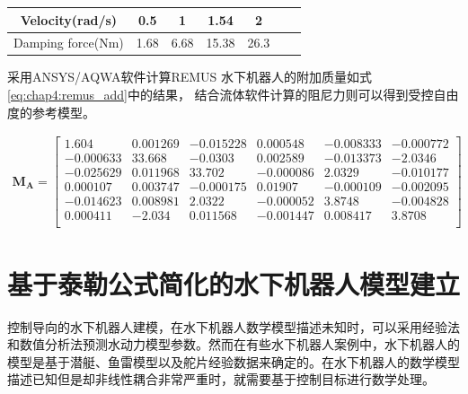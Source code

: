 \begin{table}
\centering
\label{tab:chap4:table_auv2}
\begin{tabular}{ccccccc}
\toprule
 Velocity(rad/s)    & 0.5 & 1 & 1.54 &2   \\
\midrule
 Damping force(Nm) & 1.68 &6.68 &15.38 & 26.3   \\
\bottomrule
\end{tabular}
\end{table}

采用ANSYS/AQWA软件计算REMUS 水下机器人的附加质量如式\ref{eq:chap4:remus_add}中的结果， 结合流体软件计算的阻尼力则可以得到受控自由度的参考模型。

\begin{equation}
\label{eq:chap4:remus_add}
\begin{aligned}
\bm{M_{A}} = \begin{bmatrix}
     1.604 &   0.001269 &  -0.015228 &  0.000548 &   -0.008333 & -0.000772  \\
     -0.000633 &   33.668 &  -0.0303 &  0.002589 &   -0.013373 & -2.0346  \\
     -0.025629 &  0.011968  &  33.702  &  -0.000086 &  2.0329 &  -0.010177\\
     0.000107 &  0.003747  &  -0.000175  & 0.01907 & -0.000109  &  -0.002095\\
     -0.014623  &  0.008981 &  2.0322  &  -0.000052 &   3.8748  & -0.004828\\
     0.000411  &  -2.034 &  0.011568 &  -0.001447 &  0.008417  &  3.8708\\
         \end{bmatrix}
\end{aligned}
\end{equation}






\section{基于泰勒公式简化的水下机器人模型建立  }

控制导向的水下机器人建模，在水下机器人数学模型描述未知时，可以采用经验法和数值分析法预测水动力模型参数。然而在有些水下机器人案例中，水下机器人的模型是基于潜艇、鱼雷模型以及舵片经验数据来确定的\cite{yuanchuan2001submarine,Borst1985Fluid,bottaccini1954stablity}。在水下机器人的数学模型描述已知但是却非线性耦合非常严重时，就需要基于控制目标进行数学处理。

